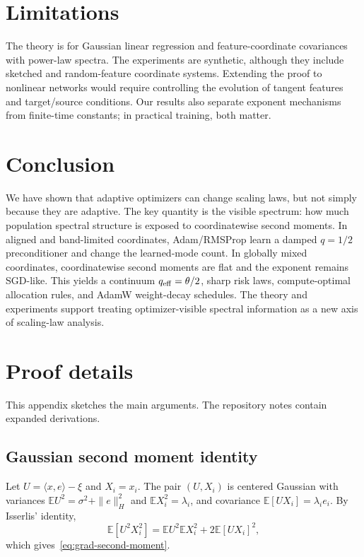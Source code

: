 \documentclass[11pt]{article}
\newcommand{\E}{\mathbb{E}}
\begin{document}
\section{Limitations}

The theory is for Gaussian linear regression and feature-coordinate covariances with power-law spectra.  The experiments are synthetic, although they include sketched and random-feature coordinate systems.  Extending the proof to nonlinear networks would require controlling the evolution of tangent features and target/source conditions.  Our results also separate exponent mechanisms from finite-time constants; in practical training, both matter.

\section{Conclusion}

We have shown that adaptive optimizers can change scaling laws, but not simply because they are adaptive.  The key quantity is the visible spectrum: how much population spectral structure is exposed to coordinatewise second moments.  In aligned and band-limited coordinates, Adam/RMSProp learn a damped $q=1/2$ preconditioner and change the learned-mode count.  In globally mixed coordinates, coordinatewise second moments are flat and the exponent remains SGD-like.  This yields a continuum $q_{\rm eff}=\theta/2$, sharp risk laws, compute-optimal allocation rules, and AdamW weight-decay schedules.  The theory and experiments support treating optimizer-visible spectral information as a new axis of scaling-law analysis.

\appendix

\section{Proof details}

This appendix sketches the main arguments.  The repository notes contain expanded derivations.

\subsection{Gaussian second moment identity}

Let $U=\langle x,e\rangle-\xi$ and $X_i=x_i$.  The pair $(U,X_i)$ is centered Gaussian with variances $\E U^2=\sigma^2+\|e\|_H^2$ and $\E X_i^2=\lambda_i$, and covariance $\E[UX_i]=\lambda_i e_i$.  By Isserlis' identity,
\begin{equation}
    \E[U^2X_i^2]=\E U^2\E X_i^2+2\E[UX_i]^2,
\end{equation}
which gives~\eqref{eq:grad-second-moment}.
\end{document}
